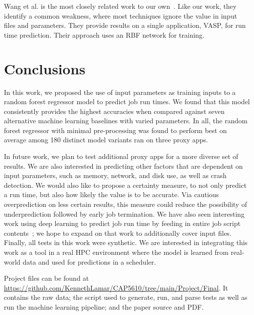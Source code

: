 \documentclass[conference, 10pt, onecolumn, draftclsnofoot]{IEEEtran}
\begin{document}
Wang et al. is the most closely related work to our own~\cite{8725643}.
Like our work, they identify a common weakness, where most techniques ignore the value in input files and parameters.
They provide results on a single application, VASP, for run time prediction.
Their approach uses an RBF network for training.

\section{Conclusions}

In this work, we proposed the use of input parameters as training inputs to a random forest regressor model to predict job run times.
We found that this model consistently provides the highest accuracies when compared against seven alternative machine learning baselines with varied parameters.
In all, the random forest regressor with minimal pre-processing was found to perform best on average among 180 distinct model variants ran on three proxy apps.

In future work, we plan to test additional proxy apps for a more diverse set of results.
We are also interested in predicting other factors that are dependent on input parameters, such as memory, network, and disk use, as well as crash detection.
We would also like to propose a certainty measure, to not only predict a run time, but also how likely the value is to be accurate.
Via cautious overprediction on less certain results, this measure could reduce the possibility of underprediction followed by early job termination.
We have also seen interesting work using deep learning to predict job run time by feeding in entire job script contents~\cite{PRIONN}; we hope to expand on that work to additionally cover input files.
Finally, all tests in this work were synthetic.
We are interested in integrating this work as a tool in a real HPC environment where the model is learned from real-world data and used for predictions in a scheduler.

Project files can be found at \url{https://github.com/KennethLamar/CAP5610/tree/main/Project/Final}.
It contains the raw data; the script used to generate, run, and parse tests as well as run the machine learning pipeline; and the paper source and PDF.



\end{document}
